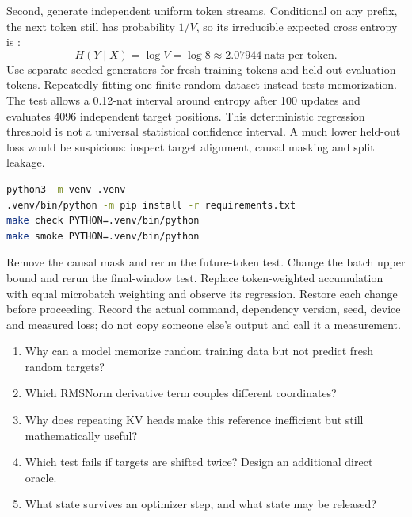 Second, generate independent uniform token streams. Conditional on any prefix,
the next token still has probability \(1/V\), so its irreducible expected
cross entropy is :
\[
 H(Y\mid X)=\log V=\log 8\approx2.07944\ \text{nats per token}.
\]
Use separate seeded generators for fresh training tokens and held-out evaluation
tokens. Repeatedly fitting one finite random dataset instead tests memorization.
The test allows a 0.12-nat interval around entropy after 100 updates and evaluates
4096 independent target positions. This deterministic regression threshold is
not a universal statistical confidence interval. A much lower held-out loss
would be suspicious: inspect target alignment, causal masking and split leakage.

\begin{lstlisting}[language=bash]
python3 -m venv .venv
.venv/bin/python -m pip install -r requirements.txt
make check PYTHON=.venv/bin/python
make smoke PYTHON=.venv/bin/python
\end{lstlisting}

Remove the causal mask and rerun the future-token test. Change the batch upper
bound and rerun the final-window test. Replace token-weighted accumulation with
equal microbatch weighting and observe its regression. Restore each change
before proceeding. Record the actual command, dependency version, seed, device
and measured loss; do not copy someone else's output and call it a measurement.

\checkpoint
\begin{enumerate}
\item Why can a model memorize random training data but not predict fresh random targets?
\item Which RMSNorm derivative term couples different coordinates?
\item Why does repeating KV heads make this reference inefficient but still mathematically useful?
\item Which test fails if targets are shifted twice? Design an additional direct oracle.
\item What state survives an optimizer step, and what state may be released?
\end{enumerate}

